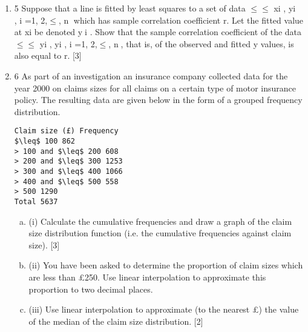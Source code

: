 \documentclass[a4paper,12pt]{article}
\begin{document}
\begin{enumerate}
\item 5 Suppose that a line is fitted by least squares to a set of data $\leq$$\leq$ xi , yi  , i =1, 2,$\leq$, n
which has sample correlation coefficient r. Let the fitted value at xi be denoted yi .
Show that the sample correlation coefficient of the data $\leq$$\leq$ yi , yi , i =1, 2,$\leq$, n, that
is, of the observed and fitted y values, is also equal to r. [3]
\item 6 As part of an investigation an insurance company collected data for the year 2000 on
claims sizes for all claims on a certain type of motor insurance policy. The resulting
data are given below in the form of a grouped frequency distribution.
\begin{verbatim}
Claim size (£) Frequency
$\leq$ 100 862
> 100 and $\leq$ 200 608
> 200 and $\leq$ 300 1253
> 300 and $\leq$ 400 1066
> 400 and $\leq$ 500 558
> 500 1290
Total 5637
\end{verbatim}


\begin{enumerate}[(a)]
    \item (i) Calculate the cumulative frequencies and draw a graph of the claim size
distribution function (i.e. the cumulative frequencies against claim size). [3]
    \item (ii) You have been asked to determine the proportion of claim sizes which are less
than £250. Use linear interpolation to approximate this proportion to two
decimal places. 
    \item (iii) Use linear interpolation to approximate (to the nearest £) the value of the
median of the claim size distribution. [2]
\end{enumerate}


\end{enumerate}
\end{document}

